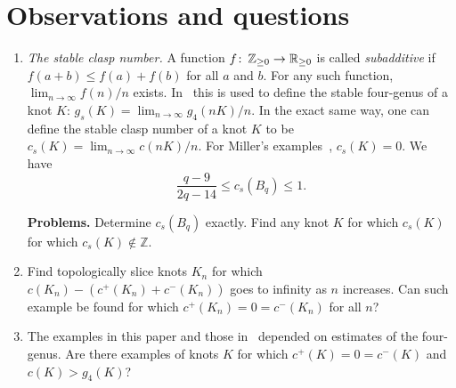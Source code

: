 \documentclass[10pt,oneside]{amsart}
\def\Z{{\mathbb Z}}
\def\R{{\mathbb R}}
\def\co{\colon\thinspace}
\theoremstyle{definition}
\begin{document}

\section{Observations and questions}

\begin{enumerate}
\item  {\it The stable clasp number.}  A  function  $f \co \Z_{\ge 0} \to \R_{\ge 0}$ is called {\it subadditive} if $f(a+b) \le f(a) +f(b)$ for all $a$ and $b$.  For any such function,    $\lim_{n\to \infty}f(n)/n$ exists.  In~\cite{MR2745668} this is used to define  the stable four-genus of a knot $K$:  $g_s(K) = \lim_{n \to \infty}g_4(nK)/n$.  In the exact same way, one can define the stable clasp number of a knot $K$ to be $c_s(K) = \lim_{n \to \infty}c(nK)/n$.  For Miller's examples~\cite{MR4453695}, $c_s(K) = 0$.  We have  
\[  \frac{q-9}{2q - 14} \le c_s(B_q) \le 1 .
\]

{\bf Problems.}   Determine $c_s(B_q)$ exactly. Find any knot $K$ for which  $c_s(K)$  for which $c_s(K) \not \in \Z$.


\item   Find topologically slice knots $K_n$ for which $c(K_n) - (c^+(K_n)+ c^-(K_n))$ goes to infinity as $n$ increases.  Can such example be found for which $c^+(K_n) = 0= c^-(K_n)$ for all $n$?

\item The examples in this paper and those in~\cite{MR4453695} depended on estimates of the four-genus.  Are there examples of knots $K$ for which $c^+(K) = 0 = c^-(K)$ and $c(K) > g_4(K)$?
\end{enumerate}




	
\end{document}
